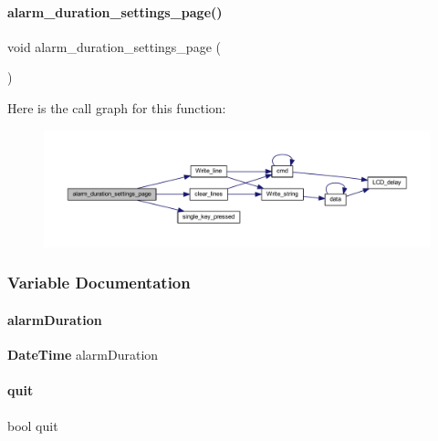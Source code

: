 \paragraph{alarm\+\_\+duration\+\_\+settings\+\_\+page()}
{\footnotesize\ttfamily void alarm\+\_\+duration\+\_\+settings\+\_\+page (\begin{DoxyParamCaption}{ }\end{DoxyParamCaption})}

Here is the call graph for this function\+:
\nopagebreak
\begin{figure}[H]
\begin{center}
\leavevmode
\includegraphics[width=350pt]{a00002_adc10f1c6bb2de8f4dd4d65901c941c0f_cgraph}
\end{center}
\end{figure}


\subsubsection{Variable Documentation}
\mbox{\label{a00002_a01c2a28170e998893c6428276cb87ae2}} 
\paragraph{alarm\+Duration}
{\footnotesize\ttfamily \textbf{ Date\+Time} alarm\+Duration}

\mbox{\label{a00002_ac746fa6ad48d19984a159f14bec028a3}} 
\paragraph{quit}
{\footnotesize\ttfamily bool quit}

